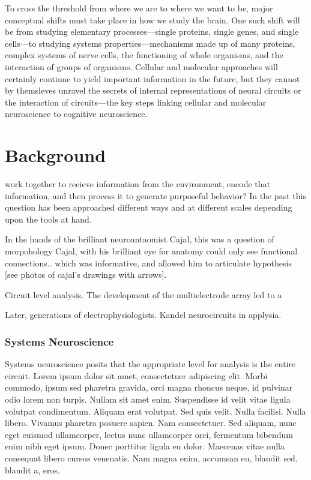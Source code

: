 \begin{savequote}[75mm] 
To cross the threshold from where we are to where we want to be, major conceptual shifts must take place in how we study the brain. One such shift will be from studying elementary processes---single proteins, single genes, and single cells---to studying systems properties---mechanisms made up of many proteins, complex systems of nerve cells, the functioning of whole organisms, and the interaction of groups of organisms. Cellular and molecular approaches will certainly continue to yield important information in the future, but they cannot by themsleves unravel the secrets of internal representations of neural circuits or the interaction of circuits---the key steps linking cellular and molecular neuroscience to cognitive neuroscience. 
\end{savequote}

\chapter{Background}

 work together to recieve information from the environment, encode that information, and then process it to generate  purposeful behavior? In the past this question has been approached different ways and at different scales depending upon the tools at hand. 


In the hands of the brilliant neuroantaomist Cajal, this was a question  of morpohology
Cajal,   with his brilliant eye for anatomy could only see functional connections.. which was informative, and allowed him to articulate hypothesis [see photos of cajal's drawings with arrows]. 



Circuit level analysis.
The development of the multielectrode array \citep{meister_synchronous_1991} \citep{litke_retinal_1991}  led to a 

Later,  generations of electrophysiologists. 
Kandel neurocircuits in applysia.


\subsection{Systems Neuroscience}

Systems neuroscience posits that the appropriate level for analysis is the entire circuit. Lorem ipsum dolor sit amet, consectetuer adipiscing elit. Morbi commodo, ipsum sed pharetra gravida, orci magna rhoncus neque, id pulvinar odio lorem non turpis. Nullam sit amet enim. Suspendisse id velit vitae ligula volutpat condimentum. Aliquam erat volutpat. Sed quis velit. Nulla facilisi. Nulla libero. Vivamus pharetra posuere sapien. Nam consectetuer. Sed aliquam, nunc eget euismod ullamcorper, lectus nunc ullamcorper orci, fermentum bibendum enim nibh eget ipsum. Donec porttitor ligula eu dolor. Maecenas vitae nulla consequat libero cursus venenatis. Nam magna enim, accumsan eu, blandit sed, blandit a, eros.

